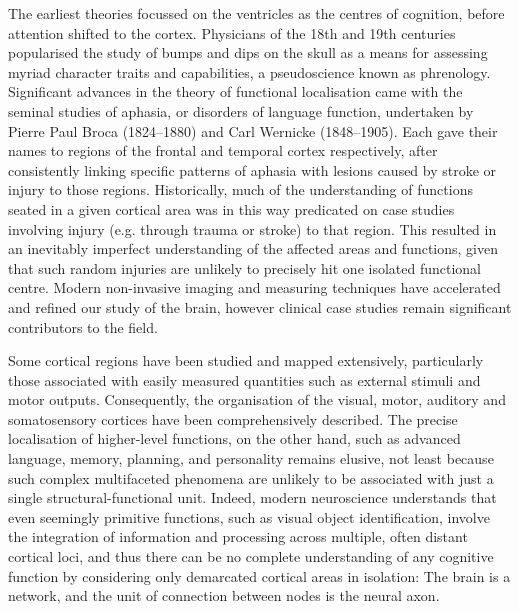 The earliest theories focussed on the ventricles as the centres of cognition, before attention shifted to the cortex\autocite{Folzenlogen2019}.
Physicians of the 18th and 19th centuries popularised the study of bumps and dips on the skull as a means for assessing myriad character traits and capabilities, a pseudoscience known as phrenology.
Significant advances in the theory of functional localisation came with the seminal studies of aphasia, or disorders of language function, undertaken by Pierre Paul Broca (1824--1880) and Carl Wernicke (1848--1905).
Each gave their names to regions of the frontal and temporal cortex respectively, after consistently linking specific patterns of aphasia with lesions caused by stroke or injury to those regions.
Historically, much of the understanding of functions seated in a given cortical area was in this way predicated on case studies involving injury (e.g. through trauma or stroke) to that region.
This resulted in an inevitably imperfect understanding of the affected areas and functions, given that such random injuries are unlikely to precisely hit one isolated functional centre.
Modern non-invasive imaging and measuring techniques have accelerated and refined our study of the brain, however clinical case studies remain significant contributors to the field.

Some cortical regions have been studied and mapped extensively, particularly those associated with easily measured quantities such as external stimuli and motor outputs.
Consequently, the organisation of the visual, motor, auditory and somatosensory cortices have been comprehensively described.
The precise localisation of higher-level functions, on the other hand, such as advanced language, memory, planning, and personality remains elusive, not least because such complex multifaceted phenomena are unlikely to be associated with just a single structural-functional unit\autocite{Catani2007}.
Indeed, modern neuroscience understands that even seemingly primitive functions, such as visual object identification, involve the integration of information and processing across multiple, often distant cortical loci\autocite{ffytche2005}, and thus there can be no complete understanding of any cognitive function by considering only demarcated cortical areas in isolation:
The brain is a network, and the unit of connection between nodes is the neural axon.

